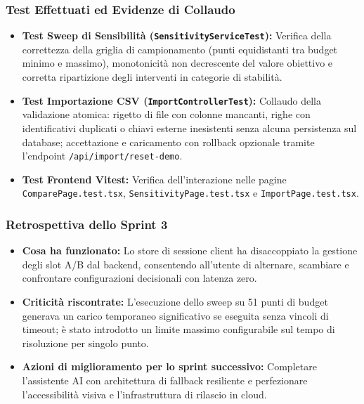 \subsubsection{Test Effettuati ed Evidenze di Collaudo}
\begin{itemize}[leftmargin=1.4em, itemsep=0.2em]
    \item \textbf{Test Sweep di Sensibilità (\texttt{SensitivityServiceTest}):} Verifica della correttezza della griglia di campionamento (punti equidistanti tra budget minimo e massimo), monotonicità non decrescente del valore obiettivo e corretta ripartizione degli interventi in categorie di stabilità.
    \item \textbf{Test Importazione CSV (\texttt{ImportControllerTest}):} Collaudo della validazione atomica: rigetto di file con colonne mancanti, righe con identificativi duplicati o chiavi esterne inesistenti senza alcuna persistenza sul database; accettazione e caricamento con rollback opzionale tramite l'endpoint \texttt{/api/import/reset-demo}.
    \item \textbf{Test Frontend Vitest:} Verifica dell'interazione nelle pagine \texttt{ComparePage.test.tsx}, \texttt{SensitivityPage.test.tsx} e \texttt{ImportPage.test.tsx}.
\end{itemize}

\subsubsection{Retrospettiva dello Sprint 3}
\begin{itemize}[leftmargin=1.4em, itemsep=0.2em]
    \item \textbf{Cosa ha funzionato:} Lo store di sessione client ha disaccoppiato la gestione degli slot A/B dal backend, consentendo all'utente di alternare, scambiare e confrontare configurazioni decisionali con latenza zero.
    \item \textbf{Criticità riscontrate:} L'esecuzione dello sweep su 51 punti di budget generava un carico temporaneo significativo se eseguita senza vincoli di timeout; è stato introdotto un limite massimo configurabile sul tempo di risoluzione per singolo punto.
    \item \textbf{Azioni di miglioramento per lo sprint successivo:} Completare l'assistente AI con architettura di fallback resiliente e perfezionare l'accessibilità visiva e l'infrastruttura di rilascio in cloud.
\end{itemize}

